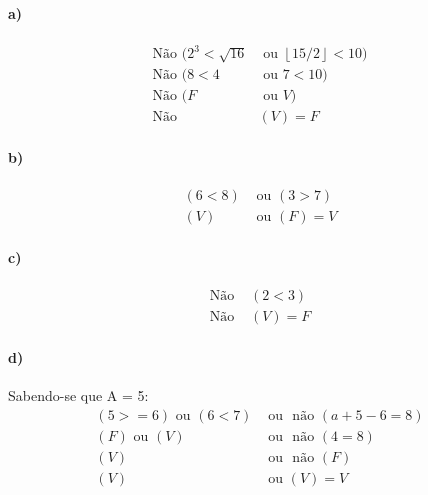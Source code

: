 \documentclass[pdftex,a4paper,12pt,brazil]{article} %
\begin{document}
\paragraph{a)}
\begin{equation*}
  \begin{split}
    \text{Não } (2^3 < \sqrt{16} & \text{ ou } \left \lfloor{15/2}\right \rfloor < 10)\\
    \text{Não } (8 < 4 & \text{ ou } 7 < 10)\\
    \text{Não } (F     & \text{ ou } V)\\
    \text{Não } & (V) = F
  \end{split}
\end{equation*}

\paragraph{b)}
\begin{equation*}
  \begin{split}
    (6 < 8) & \text{ ou } (3 > 7)\\
    (V) & \text{ ou } (F) = V
  \end{split}
\end{equation*}

\paragraph{c)}
\begin{equation*}
  \begin{split}
    \text{Não } & (2 < 3)\\
    \text{Não } & (V) = F
  \end{split}
\end{equation*}

\paragraph{d)} Sabendo-se que A = 5:
\begin{equation*}
  \begin{split}
    (5 >= 6) \text{ ou } (6 < 7) & \text{ ou } \text{ não } (a + 5 - 6 = 8)\\
    (F) \text{ ou } (V)          & \text{ ou } \text{ não } (4 = 8)\\
    (V)                          & \text{ ou } \text{ não } (F)\\
    (V)                          & \text{ ou } (V) = V
  \end{split}
\end{equation*}
\end{document}
